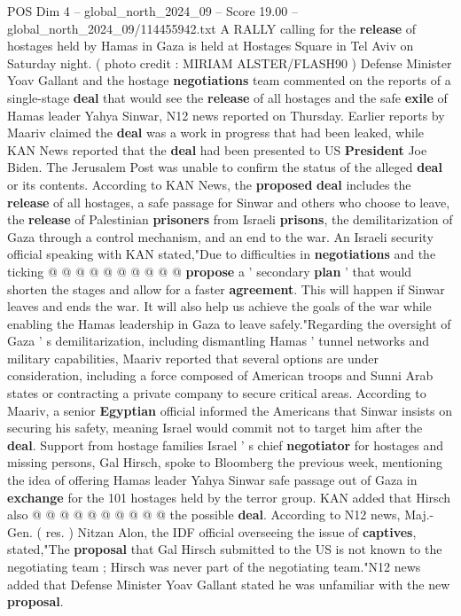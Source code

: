 \begin{textsample}{POS Dim 4 – global\_north\_2024\_09 – Score 19.00 – global\_north\_2024\_09/114455942.txt}  \label{ex:f4_pos_328}
A RALLY calling for the \textbf{release} of hostages held by Hamas in Gaza is held at Hostages Square in Tel Aviv on Saturday night. ( photo credit : MIRIAM ALSTER/FLASH90 ) Defense Minister Yoav Gallant and the hostage \textbf{negotiations} team commented on the reports of a single-stage \textbf{deal} that would see the \textbf{release} of all hostages and the safe \textbf{exile} of Hamas leader Yahya Sinwar, N12 news reported on Thursday.
Earlier reports by Maariv claimed the \textbf{deal} was a work in progress that had been leaked, while KAN News reported that the \textbf{deal} had been presented to US \textbf{President} Joe Biden.
The Jerusalem Post was unable to confirm the status of the alleged \textbf{deal} or its contents.
According to KAN News, the \textbf{proposed} \textbf{deal} includes the \textbf{release} of all hostages, a safe passage for Sinwar and others who choose to leave, the \textbf{release} of Palestinian \textbf{prisoners} from Israeli \textbf{prisons}, the demilitarization of Gaza through a control mechanism, and an end to the war.
An Israeli security official speaking with KAN stated,"Due to difficulties in \textbf{negotiations} and the ticking @ @ @ @ @ @ @ @ @ @ \textbf{propose} a ' secondary \textbf{plan} ' that would shorten the stages and allow for a faster \textbf{agreement}.
This will happen if Sinwar leaves and ends the war.
It will also help us achieve the goals of the war while enabling the Hamas leadership in Gaza to leave safely."Regarding the oversight of Gaza ' s demilitarization, including dismantling Hamas ' tunnel networks and military capabilities, Maariv reported that several options are under consideration, including a force composed of American troops and Sunni Arab states or contracting a private company to secure critical areas.
According to Maariv, a senior \textbf{Egyptian} official informed the Americans that Sinwar insists on securing his safety, meaning Israel would commit not to target him after the \textbf{deal}.
Support from hostage families Israel ' s chief \textbf{negotiator} for hostages and missing persons, Gal Hirsch, spoke to Bloomberg the previous week, mentioning the idea of offering Hamas leader Yahya Sinwar safe passage out of Gaza in \textbf{exchange} for the 101 hostages held by the terror group.
KAN added that Hirsch also @ @ @ @ @ @ @ @ @ @ the possible \textbf{deal}.
According to N12 news, Maj.-Gen. ( res. ) Nitzan Alon, the IDF official overseeing the issue of \textbf{captives}, stated,"The \textbf{proposal} that Gal Hirsch submitted to the US is not known to the negotiating team ; Hirsch was never part of the negotiating team."N12 news added that Defense Minister Yoav Gallant stated he was unfamiliar with the new \textbf{proposal}.

\end{textsample}
